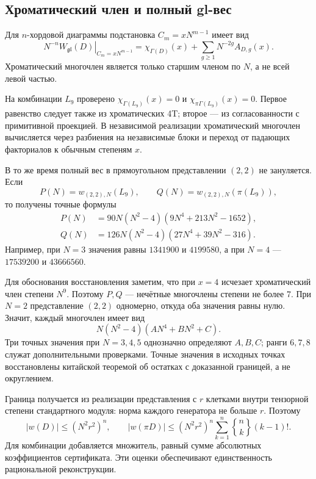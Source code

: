\documentclass[11pt,a4paper]{article}
\numberwithin{equation}{section}
\theoremstyle{definition}
\theoremstyle{remark}
\newcommand{\gl}{\mathfrak{gl}}
\newcommand{\W}{W_{\gl}}
\begin{document}
\subsection{Хроматический член и полный gl-вес}

Для $n$-хордовой диаграммы подстановка
$C_m=xN^{m-1}$ имеет вид \cite{kkl}
\begin{equation}\label{eq:chromatic}
 N^{-n}\left.\W(D)\right|_{C_m=xN^{m-1}}
 =\chi_{\Gamma(D)}(x)+\sum_{g\ge1}N^{-2g}A_{D,g}(x).
\end{equation}
Хроматический многочлен является только старшим членом по $N$,
а не всей левой частью.

На комбинации $L_9$ проверено
$\chi_{\Gamma(L_9)}(x)=0$ и
$\chi_{\pi\Gamma(L_9)}(x)=0$. Первое равенство следует также
из хроматических 4T; второе --- из согласованности с примитивной
проекцией. В независимой реализации хроматический многочлен
вычисляется через разбиения на независимые блоки и переход
от падающих факториалов к обычным степеням $x$.

В то же время полный вес в прямоугольном представлении $(2,2)$ не
зануляется. Если
\[
 P(N)=w_{(2,2),N}(L_9),\qquad
 Q(N)=w_{(2,2),N}(\pi(L_9)),
\]
то получены точные формулы
\begin{align}
 P(N)&=90N(N^2-4)(9N^4+213N^2-1652),\label{eq:rect9P}\\
 Q(N)&=126N(N^2-4)(27N^4+39N^2-316).\label{eq:rect9Q}
\end{align}
Например, при $N=3$ значения равны $1341900$ и $4199580$,
а при $N=4$ --- $17539200$ и $43666560$.

Для обоснования восстановления заметим, что при $x=4$ исчезает
хроматический член степени $N^9$. Поэтому $P,Q$ --- нечётные многочлены
степени не более 7. При $N=2$ представление $(2,2)$ одномерно,
откуда оба значения равны нулю. Значит, каждый многочлен имеет вид
\[
 N(N^2-4)(AN^4+BN^2+C).
\]
Три точных значения при $N=3,4,5$ однозначно определяют $A,B,C$;
ранги $6,7,8$ служат дополнительными проверками. Точные значения
в исходных точках восстановлены китайской теоремой об остатках
с доказанной границей, а не округлением.

Граница получается из реализации представления с $r$ клетками внутри
тензорной степени стандартного модуля: норма каждого генератора
не больше $r$. Поэтому
\[
 |w(D)|\le(N^2r^2)^n,\qquad
 |w(\pi D)|\le(N^2r^2)^n
 \sum_{k=1}^n\genfrac\{\}{0pt}{}{n}{k}(k-1)!.
\]
Для комбинации добавляется множитель, равный сумме абсолютных
коэффициентов сертификата. Эти оценки обеспечивают единственность
рациональной реконструкции.
\end{document}
